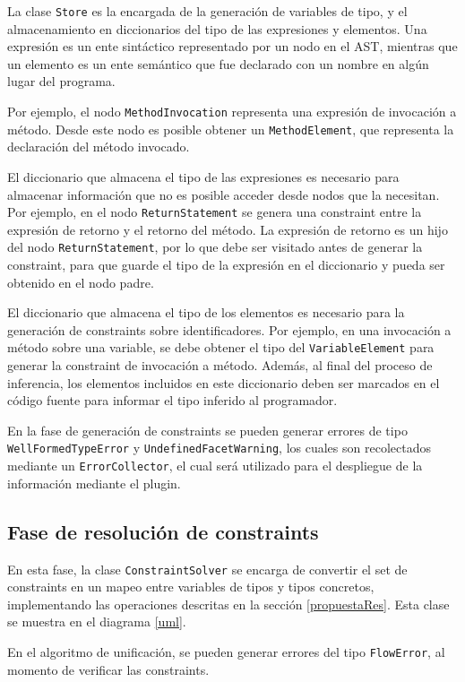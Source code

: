 La clase \texttt{Store} es la encargada de la generación de variables de tipo, y el almacenamiento en diccionarios del tipo de las expresiones y elementos. Una expresión es un ente sintáctico representado por un nodo en el AST, mientras que un elemento es un ente semántico que fue declarado con un nombre en algún lugar del programa.

Por ejemplo, el nodo \texttt{MethodInvocation} representa una expresión de invocación a método. Desde este nodo es posible obtener un \texttt{MethodElement}, que representa la declaración del método invocado.

El diccionario que almacena el tipo de las expresiones es necesario para almacenar información que no es posible acceder desde nodos que la necesitan. Por ejemplo, en el nodo \texttt{ReturnStatement} se genera una constraint entre la expresión de retorno y el retorno del método. La expresión de retorno es un hijo del nodo \texttt{ReturnStatement}, por lo que debe ser visitado antes de generar la constraint, para que guarde el tipo de la expresión en el diccionario y pueda ser obtenido en el nodo padre.

El diccionario que almacena el tipo de los elementos es necesario para la generación de constraints sobre identificadores. Por ejemplo, en una invocación a método sobre una variable, se debe obtener el tipo del \texttt{VariableElement} para generar la constraint de invocación a método. Además, al final del proceso de inferencia, los elementos incluidos en este diccionario deben ser marcados en el código fuente para informar el tipo inferido al programador.

En la fase de generación de constraints se pueden generar errores de tipo \texttt{WellFormedTypeError} y \texttt{UndefinedFacetWarning}, los cuales son recolectados mediante un \texttt{ErrorCollector}, el cual será utilizado para el despliegue de la información mediante el plugin.

\subsection{Fase de resolución de constraints}
En esta fase, la clase \texttt{ConstraintSolver} se encarga de convertir el set de constraints en un mapeo entre variables de tipos y tipos concretos, implementando las operaciones descritas en la sección \ref{propuestaRes}. Esta clase se muestra en el diagrama \ref{uml}.

En el algoritmo de unificación, se pueden generar errores del tipo \texttt{FlowError}, al momento de verificar las constraints.

